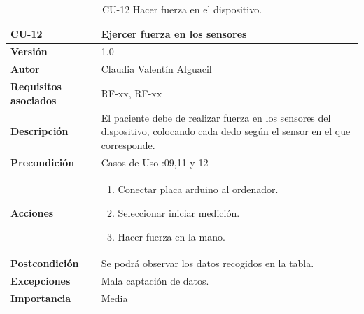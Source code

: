 \begin{table}[p]
	\centering
	\begin{tabularx}{\linewidth}{ p{} p{} }
		\toprule
		\textbf{CU-12}    & \textbf{Ejercer fuerza en los sensores}\\
		\toprule
		\textbf{Versión}              & 1.0    \\
		\textbf{Autor}                & Claudia Valentín Alguacil \\
		\textbf{Requisitos asociados} & RF-xx, RF-xx \\
		\textbf{Descripción}          & El paciente debe de realizar fuerza en los sensores del dispositivo, colocando cada dedo según el sensor en el que corresponde. \\
		\textbf{Precondición}         &  Casos de Uso :09,11 y 12\\
		\textbf{Acciones}             &
		\begin{enumerate}
			\def\labelenumi{\arabic{enumi}.}
			\tightlist
			\item Conectar placa arduino al ordenador.
			\item Seleccionar iniciar medición.
                \item Hacer fuerza en la mano.
		\end{enumerate}\\
		\textbf{Postcondición}        &  Se podrá observar los datos recogidos en la tabla. \\
		\textbf{Excepciones}          & Mala captación de datos. \\
		\textbf{Importancia}          & Media \\
		\bottomrule
	\end{tabularx}
	\caption{CU-12 Hacer fuerza en el dispositivo.}
\end{table}

